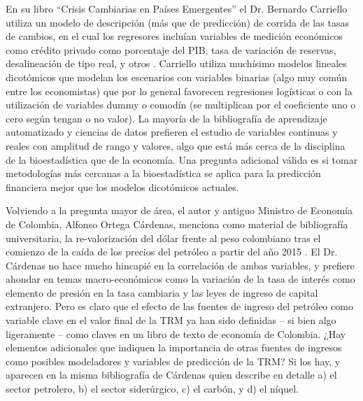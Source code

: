 En su libro “Crisis Cambiarias en Países Emergentes” el Dr. Bernardo Carriello utiliza un modelo de descripción (más que de predicción) de corrida de las tasas de cambios, en el cual los regresores incluían variables de medición económicos como crédito privado como porcentaje del PIB, tasa de variación de reservas, desalineación de tipo real, y otros \cite{crisisCambiarias}. Carriello utiliza muchísimo modelos lineales dicotómicos que modelan los escenarios con variables binarias (algo muy común entre los economistas) que por lo general favorecen regresiones logísticas o con la utilización de variables dummy o comodín (se multiplican por el coeficiente uno o cero según tengan o no valor). La mayoría de la bibliografía de aprendizaje automatizado y ciencias de datos prefieren el estudio de variables continuas y reales con amplitud de rango y valores, algo que está más cerca de la disciplina de la bioestadística que de la economía. Una pregunta adicional válida es si tomar metodologías más cercanas a la bioestadística se aplica para la predicción financiera mejor que los modelos dicotómicos actuales.

Volviendo a la pregunta mayor de área, el autor y antiguo Ministro de Economía de Colombia, Alfonso Ortega Cárdenas, menciona como material de bibliografía universitaria, la re-valorización del dólar frente al peso colombiano tras el comienzo de la caída de los precios del petróleo a partir del año 2015 \cite{cardenas}. El Dr. Cárdenas no hace mucho hincapié en la correlación de ambas variables, y prefiere ahondar en temas macro-económicos como la variación de la tasa de interés como elemento de presión en la tasa cambiaria y las leyes de ingreso de capital extranjero. Pero es claro que el efecto de las fuentes de ingreso del petróleo como variable clave en el valor final de la TRM ya han sido definidas – si bien algo ligeramente – como claves en un libro de texto de economía de Colombia. ¿Hay elementos adicionales que indiquen la importancia de otras fuentes de ingresos como posibles modeladores y variables de predicción de la TRM? Si los hay, y aparecen en la misma bibliografía de Cárdenas quien describe en detalle a) el sector petrolero, b) el sector siderúrgico, c) el carbón, y d) el níquel.

